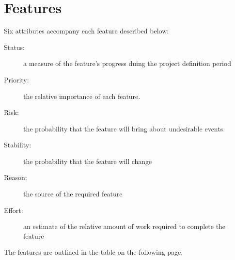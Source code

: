 \documentclass[12pt]{article}
\begin{document}
\section{Features}
Six attributes accompany each feature described below: 
    \begin{description}
        \item[Status:] a  measure of the feature's progress duing the project definition period
        \item[Priority:] the relative importance of each feature.
        \item[Risk:] the probability that the feature will bring about undesirable events
        \item[Stability:] the probability that the feature will change
        \item[Reason:] the source of the required feature
        \item[Effort:] an estimate of the relative amount of work required to complete the feature
    \end{description}
    The features are outlined in the table on the following page.
\end{document}
